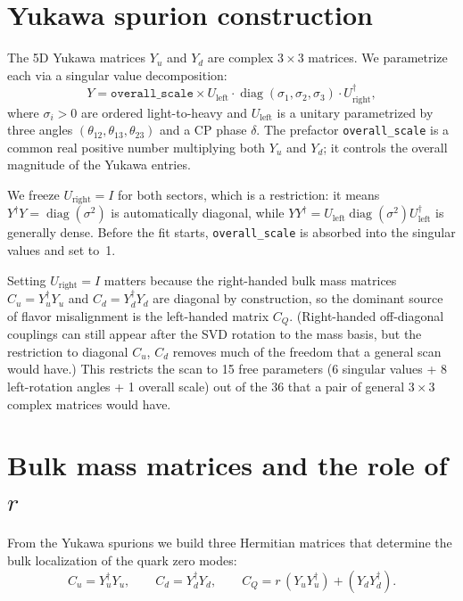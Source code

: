 \documentclass[11pt]{article}
\begin{document}
\section{Yukawa spurion construction}

The 5D Yukawa matrices $Y_u$ and $Y_d$ are complex $3\times3$ matrices. We
parametrize each via a singular value decomposition:
\begin{equation}
  Y = \texttt{overall\_scale} \times U_{\mathrm{left}}
    \cdot \operatorname{diag}(\sigma_1,\sigma_2,\sigma_3)
    \cdot U_{\mathrm{right}}^\dagger,
\end{equation}
where $\sigma_i > 0$ are ordered light-to-heavy and $U_{\mathrm{left}}$ is a unitary parametrized by three angles $(\theta_{12}, \theta_{13},
\theta_{23})$ and a CP phase $\delta$. The prefactor \texttt{overall\_scale}
is a common real positive number multiplying both $Y_u$ and $Y_d$; it controls
the overall magnitude of the Yukawa entries.

We freeze $U_{\mathrm{right}} = I$
for both sectors, which is a restriction: it means $Y^\dagger Y =
\operatorname{diag}(\sigma^2)$ is automatically diagonal, while
$Y Y^\dagger = U_{\mathrm{left}} \operatorname{diag}(\sigma^2)
U_{\mathrm{left}}^\dagger$ is generally dense. Before the fit starts,
\texttt{overall\_scale} is absorbed into the singular values and set to~1.

Setting $U_{\mathrm{right}} = I$ matters because the right-handed
bulk mass matrices $C_u = Y_u^\dagger Y_u$ and $C_d = Y_d^\dagger Y_d$ are
diagonal by construction, so the dominant source of flavor misalignment is the
left-handed matrix $C_Q$. (Right-handed off-diagonal couplings can still appear
after the SVD rotation to the mass basis, but the restriction to diagonal $C_u$,
$C_d$ removes much of the freedom that a general scan would have.)
This restricts the scan to 15 free parameters (6 singular values +
8 left-rotation angles + 1 overall scale) out of the 36 that a pair of
general $3\times3$ complex matrices would have.



\section{Bulk mass matrices and the role of $r$}

From the Yukawa spurions we build three Hermitian matrices that determine the
bulk localization of the quark zero modes:
\begin{equation}
  C_u = Y_u^\dagger Y_u, \qquad
  C_d = Y_d^\dagger Y_d, \qquad
  C_Q = r\,(Y_u Y_u^\dagger) + (Y_d Y_d^\dagger).
\end{equation}
\end{document}
